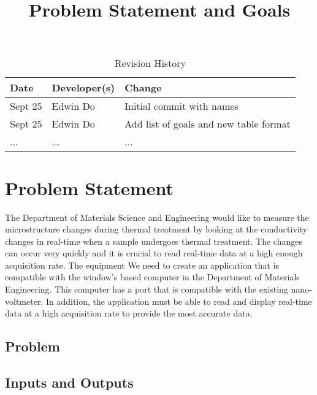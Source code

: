 \documentclass[12pt, titlepage]{article}
\title{Problem Statement and Goals\\\progname}
\author{\authname}
\date{}
\begin{document}
\maketitle

\begin{table}[hp]
\caption{Revision History} \label{TblRevisionHistory}
\begin{tabularx}{\textwidth}{llX}
\toprule
\textbf{Date} & \textbf{Developer(s)} & \textbf{Change}\\
\midrule
Sept 25 & Edwin Do & Initial commit with names\\
Sept 25 & Edwin Do & Add list of goals and new table format\\
... & ... & ...\\
\bottomrule
\end{tabularx}
\end{table}

\section{Problem Statement}
The Department of Materials Science and Engineering would like to measure the microstructure changes
during thermal treatment by looking at the conductivity changes in real-time when a sample undergoes 
thermal treatment. The changes can occur very quickly and it is crucial to read real-time data at a high enough acquisition rate.
The equipment 
We need to create an application that is compatible with the window's based computer in the Department of Materials Engineering.
This computer has a
port that is compatible with the existing nano-voltmeter. 
In addition, the application must be able to read and display real-time data at a high acquisition rate to provide the most accurate data.



\subsection{Problem}

\subsection{Inputs and Outputs}
\end{document}
